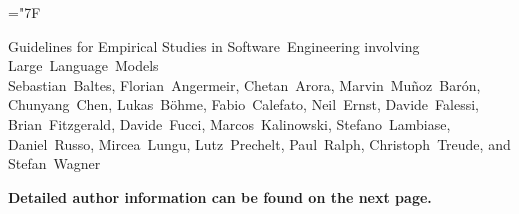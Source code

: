 \documentclass[
	pdftex,
	final,
	12pt,
	a4paper,
	parskip=false, %
	twoside, %
	footheight=0mm, %
  	foot include=false,
	toc=bibliography, %
	toc=listof, %
]{scrbook} %
\newcommand{\papertitle}{Guidelines for Empirical Studies in Software~Engineering involving Large~Language~Models}
\newcommand{\authornames}{Sebastian~Baltes, Florian~Angermeir, Chetan~Arora, Marvin~Muñoz~Barón, Chunyang~Chen, Lukas~Böhme, Fabio~Calefato, Neil~Ernst, Davide~Falessi, Brian~Fitzgerald, Davide~Fucci, Marcos~Kalinowski, Stefano~Lambiase, Daniel~Russo, Mircea~Lungu, Lutz~Prechelt, Paul~Ralph, Christoph~Treude, and Stefan~Wagner}
\begin{document}
\hyphenchar\font=\string"7F %

\frontmatter %

\begin{titlepage}

        \vfill
    
	\begin{center}
		{\LARGE\textsf{\papertitle}}\\
		\vspace{1cm}
		{\large \authornames}\\
	\end{center}

	\vspace{4cm}
		
	\begin{center}
		{\large\textbf{Detailed author information can be found on the next page.}}
	\end{center}

\end{titlepage}
\end{document}
